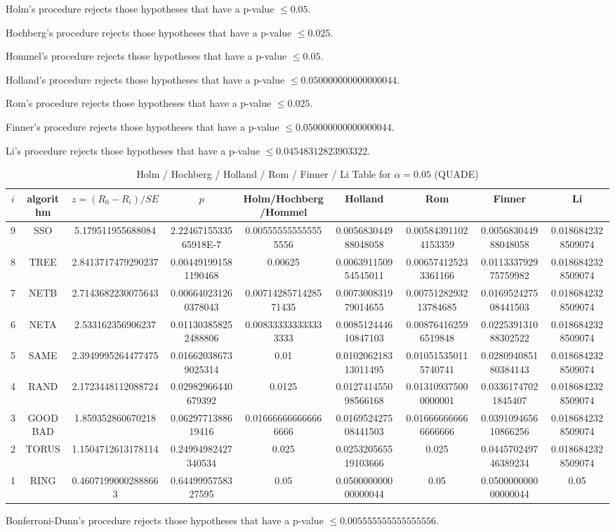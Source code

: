\documentclass[a4paper,10pt]{article}
\begin{document}
\begin{landscape}
Holm's procedure rejects those hypotheses that have a p-value $\le0.05$.


Hochberg's procedure rejects those hypotheses that have a p-value $\le0.025$.


Hommel's procedure rejects those hypotheses that have a p-value $\le0.05$.


Holland's procedure rejects those hypotheses that have a p-value $\le0.050000000000000044$.


Rom's procedure rejects those hypotheses that have a p-value $\le0.025$.


Finner's procedure rejects those hypotheses that have a p-value $\le0.050000000000000044$.


Li's procedure rejects those hypotheses that have a p-value $\le0.04548312823903322$.



\newpage

\begin{table}[!htp]
\centering\scriptsize
\caption{Holm / Hochberg / Holland / Rom / Finner / Li Table for $\alpha=0.05$ (QUADE)}
\begin{tabular}{ccccccccc}
$i$&algorithm&$z=(R_0 - R_i)/SE$&$p$&Holm/Hochberg/Hommel&Holland&Rom&Finner&Li\\
\hline
9& SSO&5.179511955688084&2.2246715533565918E-7&0.005555555555555556&0.005683044988048058&0.005843911024153359&0.005683044988048058&0.0186842328509074\\
8& TREE&2.8413717479290237&0.004491991581190468&0.00625&0.006391150954545011&0.006574125233361166&0.011333792975759982&0.0186842328509074\\
7& NETB&2.7143682230075643&0.006640231260378043&0.0071428571428571435&0.007300831979014655&0.0075128293213784685&0.016952427508441503&0.0186842328509074\\
6& NETA&2.533162356906237&0.011303858252488806&0.008333333333333333&0.008512444610847103&0.008764162596519848&0.022539131088302522&0.0186842328509074\\
5& SAME&2.3949995264477475&0.016620386739025314&0.01&0.010206218313011495&0.010515350115740741&0.028094085180384143&0.0186842328509074\\
4& RAND&2.1723448112088724&0.02982966440679392&0.0125&0.012741455098566168&0.013109375000000001&0.03361747021845407&0.0186842328509074\\
3& GOODBAD&1.859352860670218&0.0629771388619416&0.016666666666666666&0.016952427508441503&0.016666666666666666&0.039109465610866256&0.0186842328509074\\
2& TORUS&1.1504712613178114&0.24994982427340534&0.025&0.025320565519103666&0.025&0.044570249746389234&0.0186842328509074\\
1& RING&0.46071990002888663&0.6449995758327595&0.05&0.050000000000000044&0.05&0.050000000000000044&0.05\\
\hline
\end{tabular}
\end{table}
Bonferroni-Dunn's procedure rejects those hypotheses that have a p-value $\le0.005555555555555556$.



\end{landscape}
\end{document}
